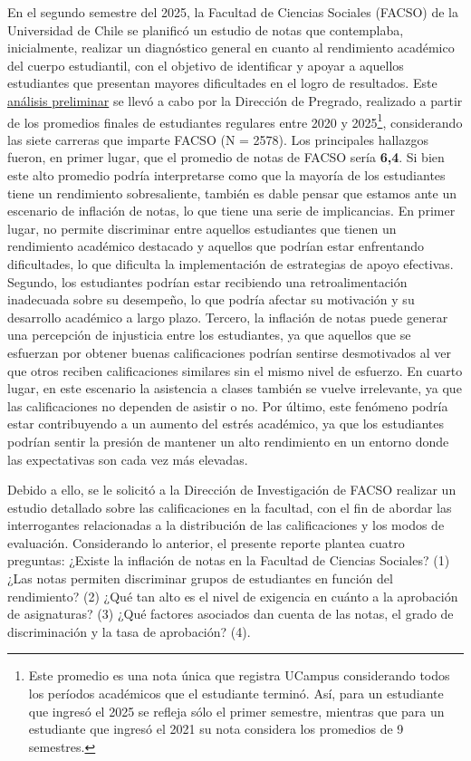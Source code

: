 \documentclass[
  spanish,
  a4paper,
  oneside]{scrbook}
\begin{document}
En el segundo semestre del 2025, la Facultad de Ciencias Sociales
(FACSO) de la Universidad de Chile se planificó un estudio de notas que
contemplaba, inicialmente, realizar un diagnóstico general en cuanto al
rendimiento académico del cuerpo estudiantil, con el objetivo de
identificar y apoyar a aquellos estudiantes que presentan mayores
dificultades en el logro de resultados. Este
\href{https://tomasurzuam.github.io/estudio-notas/output/reports/ReporteA_2025.html}{análisis
preliminar} se llevó a cabo por la Dirección de Pregrado, realizado a
partir de los promedios finales de estudiantes regulares entre 2020 y
2025\footnote{Este promedio es una nota única que registra UCampus
  considerando todos los períodos académicos que el estudiante terminó.
  Así, para un estudiante que ingresó el 2025 se refleja sólo el primer
  semestre, mientras que para un estudiante que ingresó el 2021 su nota
  considera los promedios de 9 semestres.}, considerando las siete
carreras que imparte FACSO (N = 2578). Los principales hallazgos fueron,
en primer lugar, que el promedio de notas de FACSO sería \textbf{6,4}.
Si bien este alto promedio podría interpretarse como que la mayoría de
los estudiantes tiene un rendimiento sobresaliente, también es dable
pensar que estamos ante un escenario de inflación de notas, lo que tiene
una serie de implicancias. En primer lugar, no permite discriminar entre
aquellos estudiantes que tienen un rendimiento académico destacado y
aquellos que podrían estar enfrentando dificultades, lo que dificulta la
implementación de estrategias de apoyo efectivas. Segundo, los
estudiantes podrían estar recibiendo una retroalimentación inadecuada
sobre su desempeño, lo que podría afectar su motivación y su desarrollo
académico a largo plazo. Tercero, la inflación de notas puede generar
una percepción de injusticia entre los estudiantes, ya que aquellos que
se esfuerzan por obtener buenas calificaciones podrían sentirse
desmotivados al ver que otros reciben calificaciones similares sin el
mismo nivel de esfuerzo. En cuarto lugar, en este escenario la
asistencia a clases también se vuelve irrelevante, ya que las
calificaciones no dependen de asistir o no. Por último, este fenómeno
podría estar contribuyendo a un aumento del estrés académico, ya que los
estudiantes podrían sentir la presión de mantener un alto rendimiento en
un entorno donde las expectativas son cada vez más elevadas.

Debido a ello, se le solicitó a la Dirección de Investigación de FACSO
realizar un estudio detallado sobre las calificaciones en la facultad,
con el fin de abordar las interrogantes relacionadas a la distribución
de las calificaciones y los modos de evaluación. Considerando lo
anterior, el presente reporte plantea cuatro preguntas: ¿Existe la
inflación de notas en la Facultad de Ciencias Sociales? (1) ¿Las notas
permiten discriminar grupos de estudiantes en función del rendimiento?
(2) ¿Qué tan alto es el nivel de exigencia en cuánto a la aprobación de
asignaturas? (3) ¿Qué factores asociados dan cuenta de las notas, el
grado de discriminación y la tasa de aprobación? (4).
\end{document}
